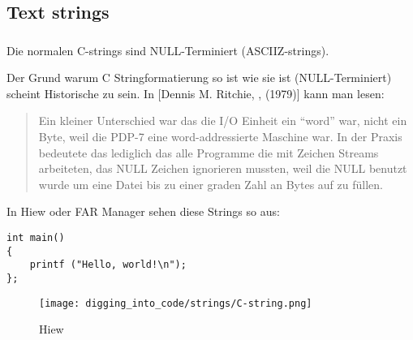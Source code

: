 \subsection{Text strings}

\subsubsection{\CCpp}

\label{C_strings}

Die normalen C-strings sind NULL-Terminiert (\ac{ASCIIZ}-strings).

Der Grund warum C Stringformatierung so ist wie sie ist (NULL-Terminiert) scheint Historische zu sein.
In [Dennis M. Ritchie, , (1979)] kann man lesen:


\begin{framed}
\begin{quotation}
Ein kleiner Unterschied war das die I/O Einheit ein ``word'' war, nicht ein Byte, weil die PDP-7 eine word-addressierte
Maschine war. In der Praxis bedeutete das lediglich das alle Programme die mit Zeichen Streams arbeiteten, das NULL 
Zeichen ignorieren mussten, weil die NULL benutzt wurde um eine Datei bis zu einer graden Zahl an Bytes auf zu füllen.

\end{quotation}
\end{framed}


In Hiew oder FAR Manager sehen diese Strings so aus:

\begin{lstlisting}[style=customc]
int main()
{
	printf ("Hello, world!\n");
};
\end{lstlisting}

\begin{figure}[H]
\centering
\texttt{[image: digging\_into\_code/strings/C-string.png]}
\caption{Hiew}
\end{figure}

